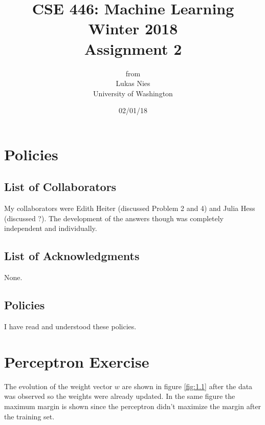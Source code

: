 \documentclass[12pt]{article}
\begin{document}
	
	\title{
		\textbf{\huge{CSE 446: Machine Learning Winter 2018 }} \\[2cm]
		\LARGE{Assignment 2}\\[1cm]
	}
	\author{from \\ Lukas Nies \\ University of Washington}
	\date{02/01/18}
	\clearpage\maketitle\thispagestyle{empty}
	\newpage

	\tableofcontents
	\setcounter{page}{0}
	\newpage
	
	\setcounter{section}{-1}
	

\section{Policies}

\subsection{List of Collaborators}

My collaborators were Edith Heiter (discussed Problem 2 and 4) and Julia Hess (discussed ?). The development of the answers though was completely independent and individually.

\subsection{List of Acknowledgments}

None.

\subsection{Policies}

I have read and understood these policies.

\section{Perceptron Exercise}

The evolution of the weight vector $w$ are shown in figure \ref{fig:1.1} after the data was observed so the weights were already updated. In the same figure the maximum margin is shown since the perceptron didn't maximize the margin after the training set.
\end{document}
